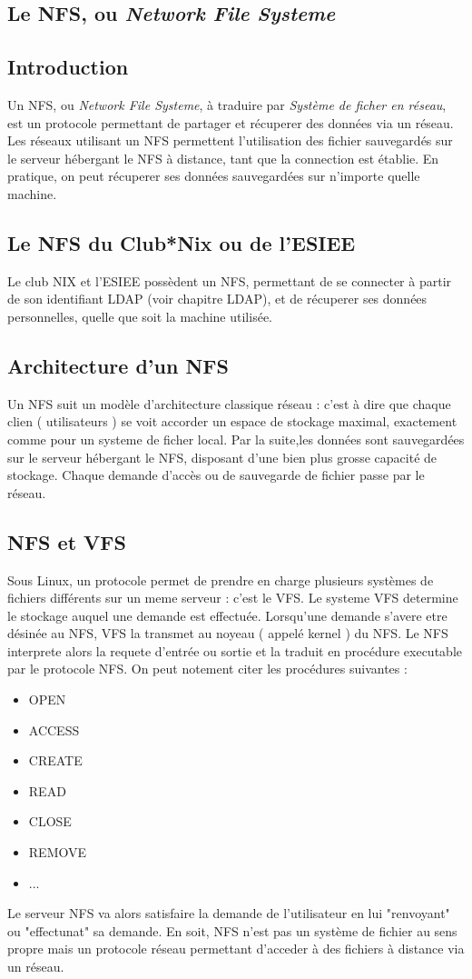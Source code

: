 \subsection{Le NFS, ou \textit{Network File Systeme}}
\subsection{Introduction}
Un NFS, ou \textit{Network File Systeme}, à traduire par \textit{Système de ficher en réseau}, est un protocole permettant de partager et récuperer des données via un réseau. Les réseaux utilisant un NFS permettent l'utilisation des fichier sauvegardés sur le serveur hébergant le NFS à distance, tant que la connection est établie. En pratique, on peut récuperer ses données sauvegardées sur n'importe quelle machine.
\subsection{Le NFS du Club*Nix ou de l'ESIEE}
Le club NIX et l'ESIEE possèdent un NFS, permettant de se connecter à partir de son identifiant LDAP (voir chapitre LDAP), et de récuperer ses données personnelles, quelle que soit la machine utilisée.
\subsection{Architecture d'un NFS}
Un NFS suit un modèle d'architecture classique réseau : c'est à dire que chaque clien ( utilisateurs ) se voit accorder un espace de stockage maximal, exactement comme pour un systeme de ficher local. Par la suite,les données sont sauvegardées sur le serveur hébergant le NFS, disposant d'une bien plus grosse capacité de stockage. Chaque demande d'accès ou de sauvegarde de fichier passe par le réseau.
\subsection{NFS et VFS}
Sous Linux, un protocole permet de prendre en charge plusieurs systèmes de fichiers différents sur un meme serveur : c'est le VFS. Le systeme VFS determine le stockage auquel une demande est effectuée.
Lorsqu'une demande s'avere etre désinée au NFS, VFS la transmet au noyeau ( appelé kernel ) du NFS. Le NFS interprete alors la requete d'entrée ou sortie et la traduit en procédure executable par le protocole NFS. On peut notement citer les procédures suivantes :
\begin{itemize}
  \item OPEN
  \item ACCESS
  \item CREATE
  \item READ
  \item CLOSE
  \item REMOVE
  \item ...
\end{itemize}
Le serveur NFS va alors satisfaire la demande de l'utilisateur en lui "renvoyant" ou "effectunat" sa demande.
En soit, NFS n'est pas un système de fichier au sens propre mais un protocole réseau permettant d'acceder à des fichiers à distance via un réseau.
